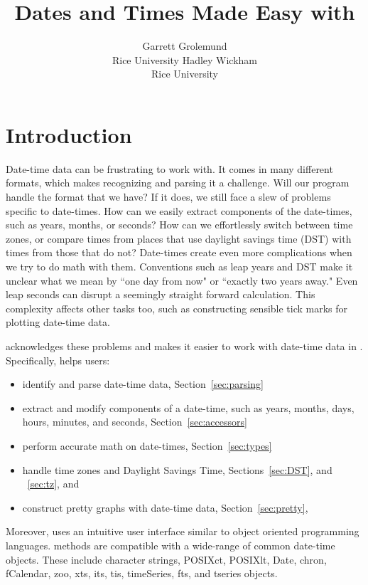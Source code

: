 \documentclass[article]{jss}
\author{Garrett Grolemund\\Rice University \And 
        Hadley Wickham\\Rice University}
\title{Dates and Times Made Easy with \pkg{lubridate}}
\begin{document}
\section{Introduction}

Date-time data can be frustrating to work with. It comes in many different formats, which makes recognizing and parsing it a challenge. Will our program handle the format that we have? If it does, we still face a slew of problems specific to date-times. How can we easily extract components of the date-times, such as years, months, or seconds? How can we effortlessly switch between time zones, or compare times from places that use daylight savings time (DST) with times from those that do not? Date-times create even more complications when we try to do math with them. Conventions such as leap years and DST make it unclear what we mean by ``one day from now" or ``exactly two years away."  Even leap seconds can disrupt a seemingly straight forward calculation.  This complexity affects other tasks too, such as constructing sensible tick marks for plotting date-time data.

  acknowledges these problems and makes it easier to work with date-time data in . Specifically,  helps users:

\begin{itemize}
   \item identify and parse date-time data, Section~\ref{sec:parsing} 
   
    \item extract and modify components of a date-time, such as years, months, days, hours, minutes, and seconds, Section~\ref{sec:accessors}
  
  \item perform accurate math on date-times, Section~\ref{sec:types}
    
  \item handle time zones and Daylight Savings Time, Sections~\ref{sec:DST}, and ~\ref{sec:tz}, and
  
   \item construct pretty graphs with date-time data, Section~\ref{sec:pretty}, 
  
\end{itemize}

Moreover,  uses an intuitive user interface similar to object oriented programming languages.   methods are compatible with a wide-range of common date-time objects. These include character strings, POSIXct, POSIXlt, Date, chron, fCalendar, zoo, xts, its, tis, timeSeries, fts, and tseries objects.\\
\end{document}
